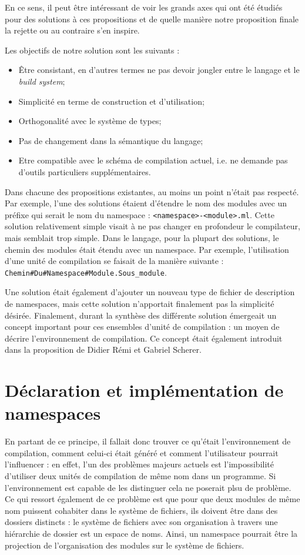 \documentclass[11pt,a4paper]{report}
\begin{document}
En ce sens, il peut être intéressant de voir les grands axes qui ont été étudiés
pour des solutions à ces propositions et de quelle manière notre proposition
finale la rejette ou au contraire s'en inspire.

Les objectifs de notre solution sont les suivants :
\begin{itemize}
\item \^{E}tre consistant, en d'autres termes ne pas devoir jongler entre le
  langage et le \emph{build system};
\item Simplicité en terme de construction et d'utilisation;
\item Orthogonalité avec le système de types;
\item Pas de changement dans la sémantique du langage;
\item Etre compatible avec le schéma de compilation actuel, i.e. ne demande
  pas d'outils particuliers supplémentaires.
\end{itemize}

Dans chacune des propositions existantes, au moins un point n'était pas
respecté. Par exemple, l'une des solutions étaient d'étendre le nom des modules
avec un préfixe qui serait le nom du namespace :
\texttt{<namespace>-<module>.ml}. Cette solution relativement simple visait à ne
pas changer en profondeur le compilateur, mais semblait trop simple. Dans le
langage, pour la plupart des solutions, le chemin des modules était étendu avec
un namespace. Par exemple, l'utilisation d'une unité de compilation se faisait
de la manière suivante :
\texttt{Chemin\#Du\#Namespace\#Module.Sous\_module}. 

Une solution était également d'ajouter un nouveau type de fichier de description
de namespaces, mais cette solution n'apportait finalement pas la simplicité
désirée. Finalement, durant la synthèse des différente solution émergeait un
concept important pour ces ensembles d'unité de compilation : un moyen de
décrire l'environnement de compilation. Ce concept était également introduit
dans la proposition de Didier Rémi et Gabriel Scherer.

\section{Déclaration et implémentation de namespaces}

En partant de ce principe, il fallait donc trouver ce qu'était l'environnement
de compilation, comment celui-ci était généré et comment l'utilisateur pourrait
l'influencer : en effet, l'un des problèmes majeurs actuels est l'impossibilité
d'utiliser deux unités de compilation de même nom dans un programme. Si
l'environnement est capable de les distinguer cela ne poserait plsu de
problème. Ce qui ressort également de ce problème est que pour que deux modules
de même nom puissent cohabiter dans le système de fichiers, ils doivent être
dans des dossiers distincts : le système de fichiers avec son organisation à
travers une hiérarchie de dossier est un espace de noms. Ainsi, un namespace
pourrait être la projection de l'organisation des modules sur le système de
fichiers.
\end{document}
